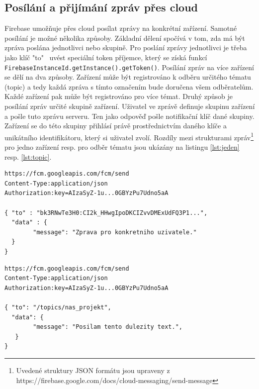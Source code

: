 \subsection*{Posílání a přijímání zpráv přes cloud}

Firebase umožňuje přes cloud posílat zprávy na konkrétní zařízení. Samotné posílání je možné několika způsoby. Základní dělení spočívá v tom, zda má být zpráva poslána jednotlivci nebo skupině. Pro poslání zprávy jednotlivci je třeba jako klíč "to"~ uvést speciální token příjemce, který se získá funkcí \texttt{FirebaseInstanceId.getInstance().getToken()}. Posílání zpráv na více zařízení se dělí na dva způsoby. Zařízení může být registrováno k odběru určitého tématu (topic) a tedy každá zpráva s tímto označením bude doručena všem odběratelům. Každé zařízení pak může být registrováno pro více témat. Druhý způsob je posílání zpráv určité skupině zařízení. Uživatel ve zprávě definuje skupinu zařízení a pošle tuto zprávu serveru. Ten jako odpověď pošle notifikační klíč dané skupiny. Zařízení se do této skupiny přihlásí právě prostřednictvím daného klíče a unikátního identifikátoru, který si uživatel zvolí. Rozdíly mezi strukturami zpráv\footnote{Uvedené struktury JSON formátu jsou upraveny z https://firebase.google.com/docs/cloud-messaging/send-message} pro jedno zařízení resp. pro odběr tématu jsou ukázány na listingu \ref{lst:jeden} resp. \ref{lst:topic}.


\begin{lstlisting}[frame=single, caption={Příklad struktury zprávy pro poslání konkrétnímu uživateli. Na prvním řádku je adresa serveru, druhý udává formát zprávy a na třetím je autorizační klíč, který je unikátní pro každou aplikaci ve Firebase a odlišuje tak zprávy jiných aplikací. Klíč "to"~ obsahuje token příjemce.}, captionpos=b, label={lst:jeden}]
https://fcm.googleapis.com/fcm/send
Content-Type:application/json
Authorization:key=AIzaSyZ-1u...0GBYzPu7Udno5aA

{ "to" : "bk3RNwTe3H0:CI2k_HHwgIpoDKCIZvvDMExUdFQ3P1...",
  "data" : {
    	"message": "Zprava pro konkretniho uzivatele."
  }  
}

\end{lstlisting}

\begin{lstlisting}[frame=single, caption={Příklad struktury zprávy pro poslání na konkrétní téma.}, captionpos=b,label={lst:topic}]
https://fcm.googleapis.com/fcm/send
Content-Type:application/json
Authorization:key=AIzaSyZ-1u...0GBYzPu7Udno5aA

{ "to": "/topics/nas_projekt",
  "data": {
    	"message": "Posilam tento dulezity text.",
   }
}
\end{lstlisting}

